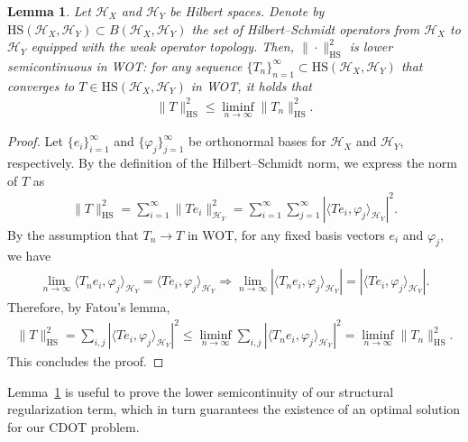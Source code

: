 \documentclass{article}
\theoremstyle{plain}
\newtheorem{lemma}[theorem]{Lemma}
\theoremstyle{definition}
\theoremstyle{remark}
\begin{document}
\begin{lemma}
	\label{lem:HS-lower-semicontinuous}
	Let $\mathcal{H}_X$ and $\mathcal{H}_Y$ be Hilbert spaces. Denote by $\mathrm{HS}(\mathcal{H}_X,\mathcal{H}_Y) \subset B(\mathcal{H}_X,\mathcal{H}_Y)$ the set of Hilbert--Schmidt operators from $\mathcal{H}_X$ to $\mathcal{H}_Y$ equipped with the weak operator topology. Then, $\| \cdot \|_{\mathrm{HS}}^2$ is lower semicontinuous in WOT: for any sequence $\{T_n\}_{n=1}^{\infty} \subset \mathrm{HS}(\mathcal{H}_X,\mathcal{H}_Y) $ that converges to $T \in \mathrm{HS}(\mathcal{H}_X,\mathcal{H}_Y)$ in WOT, it holds that
	\begin{align*}
		\| T \|_{\mathrm{HS}}^2 \leq \liminf_{n \to \infty} \| T_n \|_{\mathrm{HS}}^2 .
	\end{align*}
\end{lemma}
\begin{proof}
	Let $\{e_i\}_{i=1}^{\infty}$ and $\{\varphi_j\}_{j=1}^{\infty}$ be orthonormal bases for $\mathcal{H}_X$ and $\mathcal{H}_Y$, respectively. By the definition of the Hilbert--Schmidt norm, we express the norm of $T$ as
	\begin{align*}
		\| T \|_{\mathrm{HS}}^2 = \sum_{i=1}^{\infty} \| T e_i \|_{\mathcal{H}_Y}^2 = \sum_{i=1}^{\infty} \sum_{j=1}^{\infty} | \langle Te_i, \varphi_j \rangle_{\mathcal{H}_Y} |^2 .
	\end{align*}
	By the assumption that $T_n \to T$ in WOT, for any fixed basis vectors $e_i$ and $\varphi_j$, we have
	\begin{align*}
		\lim_{n \to \infty} \langle T_n e_i, \varphi_j \rangle_{\mathcal{H}_Y} = \langle T e_i, \varphi_j \rangle_{\mathcal{H}_Y} \Longrightarrow \lim_{n \to \infty} \left\vert \langle T_n e_i, \varphi_j \rangle_{\mathcal{H}_Y} \right\vert = \left\vert \langle T e_i, \varphi_j \rangle_{\mathcal{H}_Y} \right\vert .
	\end{align*}
	Therefore, by Fatou's lemma,
	\begin{align*}
		\| T \|_{\mathrm{HS}}^2 = \sum_{i,j} | \langle Te_i, \varphi_j \rangle_{\mathcal{H}_Y} |^2 \leq \liminf_{n \to \infty} \sum_{i,j} | \langle T_n e_i, \varphi_j \rangle_{\mathcal{H}_Y} |^2 = \liminf_{n \to \infty} \| T_n \|_{\mathrm{HS}}^2 .
	\end{align*}
	This concludes the proof.
\end{proof}

Lemma~\ref{lem:HS-lower-semicontinuous} is useful to prove the lower semicontinuity of our structural regularization term, which in turn guarantees the existence of an optimal solution for our CDOT problem.
\end{document}
